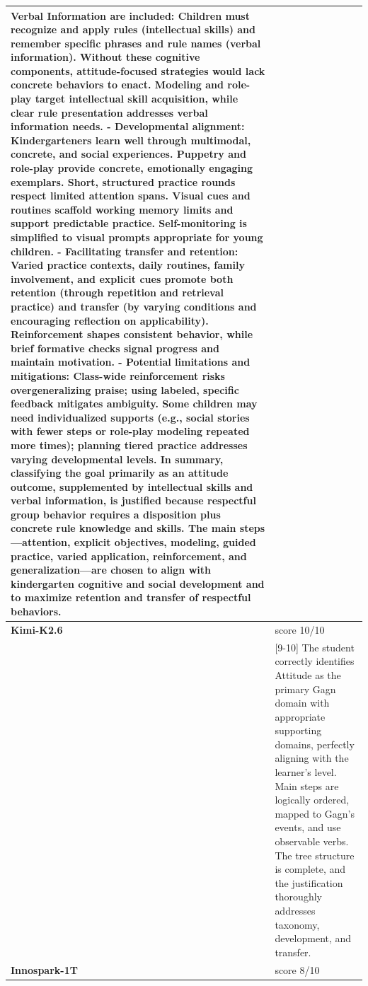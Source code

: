 \begin{longtable}{@{}l p{12.5cm}@{}}
Verbal Information are included: Children must recognize and apply rules (intellectual skills) and remember specific phrases and rule names (verbal information). Without these cognitive components, attitude-focused strategies would lack concrete behaviors to enact. Modeling and role-play target intellectual skill acquisition, while clear rule presentation addresses verbal information needs. - Developmental alignment: Kindergarteners learn well through multimodal, concrete, and social experiences. Puppetry and role-play provide concrete, emotionally engaging exemplars. Short, structured practice rounds respect limited attention spans. Visual cues and routines scaffold working memory limits and support predictable practice. Self-monitoring is simplified to visual prompts appropriate for young children. - Facilitating transfer and retention: Varied practice contexts, daily routines, family involvement, and explicit cues promote both retention (through repetition and retrieval practice) and transfer (by varying conditions and encouraging reflection on applicability). Reinforcement shapes consistent behavior, while brief formative checks signal progress and maintain motivation. - Potential limitations and mitigations: Class-wide reinforcement risks overgeneralizing praise; using labeled, specific feedback mitigates ambiguity. Some children may need individualized supports (e.g., social stories with fewer steps or role-play modeling repeated more times); planning tiered practice addresses varying developmental levels. In summary, classifying the goal primarily as an attitude outcome, supplemented by intellectual skills and verbal information, is justified because respectful group behavior requires a disposition plus concrete rule knowledge and skills. The main steps---attention, explicit objectives, modeling, guided practice, varied application, reinforcement, and generalization---are chosen to align with kindergarten cognitive and social development and to maximize retention and transfer of respectful behaviors. \\
  \midrule
  \textbf{Kimi-K2.6} & score 10/10 \\
  & [9-10] The student correctly identifies Attitude as the primary Gagn domain with appropriate supporting domains, perfectly aligning with the learner's level. Main steps are logically ordered, mapped to Gagn's events, and use observable verbs. The tree structure is complete, and the justification thoroughly addresses taxonomy, development, and transfer. \\
  \textbf{Innospark-1T} & score 8/10 \\

\end{longtable}
